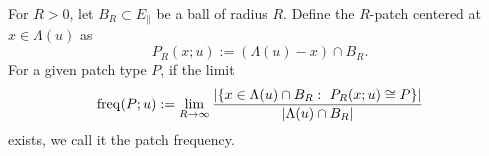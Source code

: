 \begin{definition}\label{def:patch-frequency}
For $R>0$, let $B_R\subset E_{\parallel}$ be a ball of radius $R$. Define the $R$-patch centered at $x\in\Lambda(u)$ as
\[
P_R(x;u):=(\Lambda(u)-x)\cap B_R.
\]
For a given patch type $P$, if the limit
\[
\mathrm{freq}(P;u):=\lim_{R\to\infty}\frac{\left\lvert \{x\in\Lambda(u)\cap B_R:\ P_R(x;u)\cong P\}\right\rvert}{\left\lvert \Lambda(u)\cap B_R\right\rvert}
\]
exists, we call it the patch frequency.
\end{definition}
